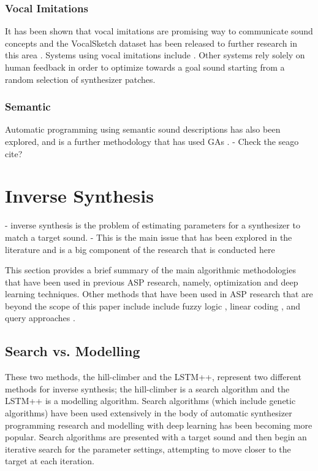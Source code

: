  \subsubsection{Vocal Imitations}
 It has been shown that vocal imitations are promising way to communicate sound concepts \cite{lemaitre2014effectiveness} and the VocalSketch dataset has been released to further research in this area \cite{cartwright2015vocalsketch}. Systems using vocal imitations include \cite{mcartwright2014}\cite{zhang2018visualization}. Other systems rely solely on human feedback in order to optimize towards a goal sound starting from a random selection of synthesizer patches. 
 
 \subsubsection{Semantic}
 Automatic programming using semantic sound descriptions has also been explored, and is a further methodology that has used GAs \cite{krekovic2016algorithm}.
 - Check the seago cite?

\section{Inverse Synthesis}
- inverse synthesis is the problem of estimating parameters for a synthesizer to match a target sound.
- This is the main issue that has been explored in the literature and is a big component of the research that is conducted here
 
This section provides a brief summary of the main algorithmic methodologies that have been used in previous ASP research, namely, optimization and deep learning techniques. Other methods that have been used in ASP research that are beyond the scope of this paper include  include fuzzy logic \cite{mitchell2005frequency, hamadicharef2012intelligent}, linear coding \cite{mintz2007toward}, and query approaches \cite{mcartwright2014}.

\subsection{Search vs. Modelling}
These two methods, the hill-climber and the LSTM++, represent two different methods for inverse synthesis; the hill-climber is a search algorithm and the LSTM++ is a modelling algorithm. Search algorithms (which include genetic algorithms) have been used extensively in the body of automatic synthesizer programming research and modelling with deep learning has been becoming more popular. Search algorithms are presented with a target sound and then begin an iterative search for the parameter settings, attempting to move closer to the target at each iteration.

